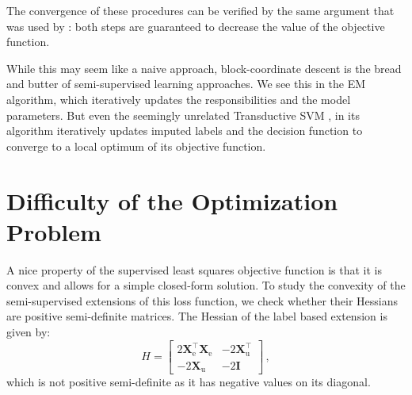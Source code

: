 \documentclass[twoside]{memoir}\usepackage[]{graphicx}\usepackage{xcolor}
\renewcommand{\cite}{\citep}
\begin{document}
The convergence of these procedures can be verified by the same argument that was used by \citet{Healy1956}: both steps are guaranteed to decrease the value of the objective function.

While this may seem like a naive approach, block-coordinate descent is the bread and butter of semi-supervised learning approaches. We see this in the EM algorithm, which iteratively updates the responsibilities and the model parameters. But even the seemingly unrelated Transductive SVM \cite{Joachims1999}, in its algorithm iteratively updates imputed labels and the decision function to converge to a local optimum of its objective function.

\section{Difficulty of the Optimization Problem}
A nice property of the supervised least squares objective function is that it is convex and allows for a simple closed-form solution. To study the convexity of the semi-supervised extensions of this loss function, we check whether their Hessians are positive semi-definite matrices. The Hessian of the label based extension is given by:
$$
H=\begin{bmatrix} 
2 \mathbf{X}_\text{e}^\top \mathbf{X}_\text{e} & 
-2 \mathbf{X}_\text{u}^\top \\
-2 \mathbf{X}_\text{u} &
-2 \mathbf{I}
\end{bmatrix} \,,
$$
which is not positive semi-definite as it has negative values on its diagonal.
\end{document}
